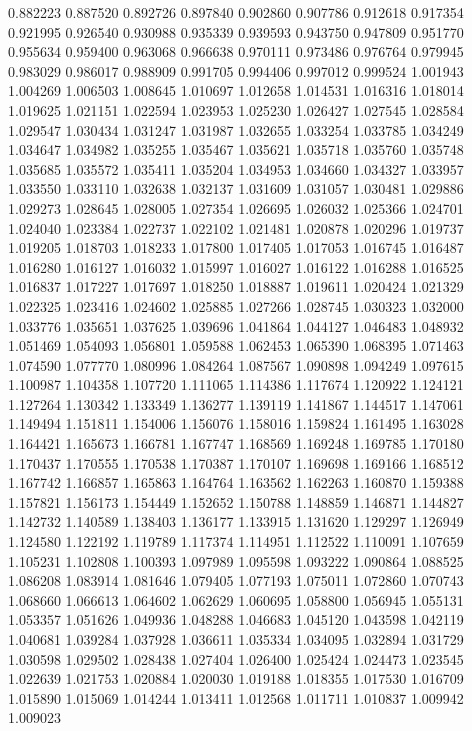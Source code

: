 0.882223
0.887520
0.892726
0.897840
0.902860
0.907786
0.912618
0.917354
0.921995
0.926540
0.930988
0.935339
0.939593
0.943750
0.947809
0.951770
0.955634
0.959400
0.963068
0.966638
0.970111
0.973486
0.976764
0.979945
0.983029
0.986017
0.988909
0.991705
0.994406
0.997012
0.999524
1.001943
1.004269
1.006503
1.008645
1.010697
1.012658
1.014531
1.016316
1.018014
1.019625
1.021151
1.022594
1.023953
1.025230
1.026427
1.027545
1.028584
1.029547
1.030434
1.031247
1.031987
1.032655
1.033254
1.033785
1.034249
1.034647
1.034982
1.035255
1.035467
1.035621
1.035718
1.035760
1.035748
1.035685
1.035572
1.035411
1.035204
1.034953
1.034660
1.034327
1.033957
1.033550
1.033110
1.032638
1.032137
1.031609
1.031057
1.030481
1.029886
1.029273
1.028645
1.028005
1.027354
1.026695
1.026032
1.025366
1.024701
1.024040
1.023384
1.022737
1.022102
1.021481
1.020878
1.020296
1.019737
1.019205
1.018703
1.018233
1.017800
1.017405
1.017053
1.016745
1.016487
1.016280
1.016127
1.016032
1.015997
1.016027
1.016122
1.016288
1.016525
1.016837
1.017227
1.017697
1.018250
1.018887
1.019611
1.020424
1.021329
1.022325
1.023416
1.024602
1.025885
1.027266
1.028745
1.030323
1.032000
1.033776
1.035651
1.037625
1.039696
1.041864
1.044127
1.046483
1.048932
1.051469
1.054093
1.056801
1.059588
1.062453
1.065390
1.068395
1.071463
1.074590
1.077770
1.080996
1.084264
1.087567
1.090898
1.094249
1.097615
1.100987
1.104358
1.107720
1.111065
1.114386
1.117674
1.120922
1.124121
1.127264
1.130342
1.133349
1.136277
1.139119
1.141867
1.144517
1.147061
1.149494
1.151811
1.154006
1.156076
1.158016
1.159824
1.161495
1.163028
1.164421
1.165673
1.166781
1.167747
1.168569
1.169248
1.169785
1.170180
1.170437
1.170555
1.170538
1.170387
1.170107
1.169698
1.169166
1.168512
1.167742
1.166857
1.165863
1.164764
1.163562
1.162263
1.160870
1.159388
1.157821
1.156173
1.154449
1.152652
1.150788
1.148859
1.146871
1.144827
1.142732
1.140589
1.138403
1.136177
1.133915
1.131620
1.129297
1.126949
1.124580
1.122192
1.119789
1.117374
1.114951
1.112522
1.110091
1.107659
1.105231
1.102808
1.100393
1.097989
1.095598
1.093222
1.090864
1.088525
1.086208
1.083914
1.081646
1.079405
1.077193
1.075011
1.072860
1.070743
1.068660
1.066613
1.064602
1.062629
1.060695
1.058800
1.056945
1.055131
1.053357
1.051626
1.049936
1.048288
1.046683
1.045120
1.043598
1.042119
1.040681
1.039284
1.037928
1.036611
1.035334
1.034095
1.032894
1.031729
1.030598
1.029502
1.028438
1.027404
1.026400
1.025424
1.024473
1.023545
1.022639
1.021753
1.020884
1.020030
1.019188
1.018355
1.017530
1.016709
1.015890
1.015069
1.014244
1.013411
1.012568
1.011711
1.010837
1.009942
1.009023
